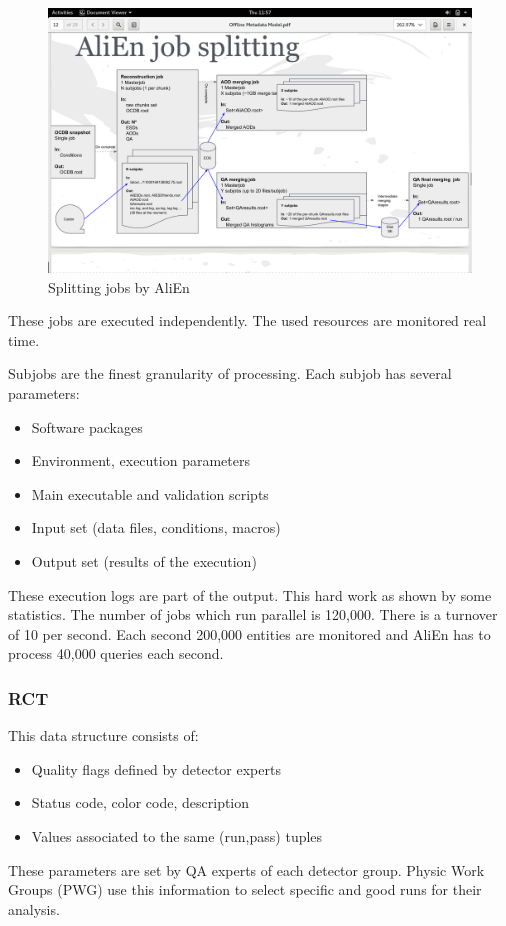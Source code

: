 \begin{figure}[h]
  \begin{center}
    \includegraphics[scale=0.15]{./images/splitting_subjobs}
    \caption{Splitting jobs by AliEn}
    \label{fig:splitting_subjobs}
  \end{center}
\end{figure}

These jobs are executed independently. The used resources are monitored real time.

Subjobs are the finest granularity of processing. Each subjob has several parameters:
\begin{itemize}
  \item Software packages
  \item Environment, execution parameters
  \item Main executable and validation scripts
  \item Input set (data files, conditions, macros)
  \item Output set (results of the execution)
\end{itemize}
These execution logs are part of the output. This hard work as shown by some statistics. The number of jobs which run parallel  is 120,000. There is a turnover of 10 per second. Each second 200,000 entities are monitored and AliEn has to process 40,000 queries each second.

\subsubsection{RCT}
This data structure consists of:
\begin{itemize}
  \item Quality flags defined by detector experts
  \item Status code, color code, description
  \item Values associated to the same (run,pass) tuples
\end{itemize}
These parameters are set by QA experts of each detector group. Physic Work Groups (PWG) use this information to select specific and good runs for their analysis.

